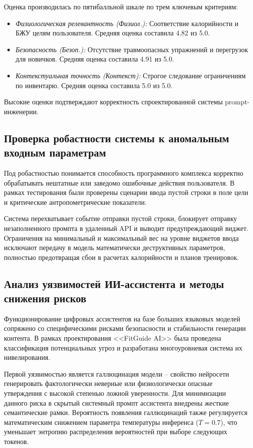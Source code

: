 \documentclass[14pt, a4paper]{extarticle}
\begin{document}
Оценка производилась по пятибалльной шкале по трем ключевым критериям:
\begin{itemize}
    \item \textit{Физиологическая релевантность (Физиол.):} Соответствие калорийности и БЖУ целям пользователя. Средняя оценка составила 4.82 из 5.0.
    \item \textit{Безопасность (Безоп.):} Отсутствие травмоопасных упражнений и перегрузок для новичков. Средняя оценка составила 4.91 из 5.0.
    \item \textit{Контекстуальная точность (Контекст):} Строгое следование ограничениям по инвентарю. Средняя оценка составила 5.0 из 5.0.
\end{itemize}
Высокие оценки подтверждают корректность спроектированной системы prompt-инженерии.

\subsection{Проверка робастности системы к аномальным входным параметрам}

Под робастностью понимается способность программного комплекса корректно обрабатывать нештатные или заведомо ошибочные действия пользователя. В рамках тестирования были проверены сценарии ввода пустой строки в поле цели и критические антропометрические показатели.

Система перехватывает событие отправки пустой строки, блокирует отправку незаполненного промпта в удаленный API и выводит предупреждающий виджет. Ограничения на минимальный и максимальный вес на уровне виджетов ввода исключают передачу в модель математически деструктивных параметров, полностью предотвращая сбои в расчетах калорийности и планов тренировок.

\subsection{Анализ уязвимостей ИИ-ассистента и методы снижения рисков}

Функционирование цифровых ассистентов на базе больших языковых моделей сопряжено со специфическими рисками безопасности и стабильности генерации контента. В рамках проектирования <<FitGuide AI>> была проведена классификация потенциальных угроз и разработана многоуровневая система их нивелирования.

Первой уязвимостью является галлюцинация модели -- свойство нейросети генерировать фактологически неверные или физиологически опасные утверждения с высокой степенью ложной уверенности. Для минимизации данного риска в скрытый системный промпт ассистента внедрены жесткие семантические рамки. Вероятность появления галлюцинаций также регулируется математическим снижением параметра температуры инференса ($T = 0.7$), что уменьшает энтропию распределения вероятностей при выборе следующих токенов.
\end{document}
